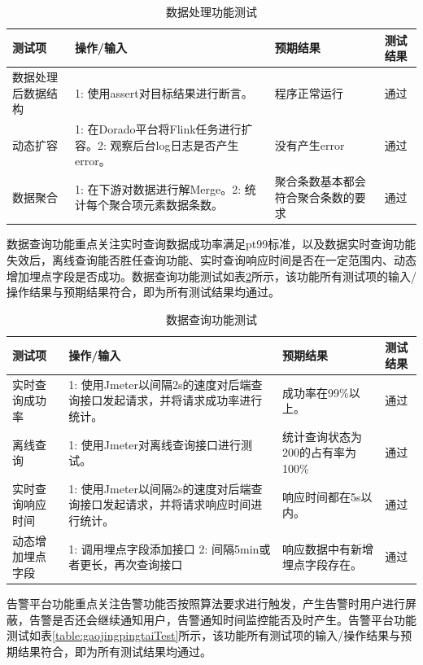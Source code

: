 \begin{longtable}[htbp]
\begin{table}[h]  
\centering  
\caption{数据处理功能测试}
\begin{tabular}{|l|p{4cm}|p{3cm}|l|}  
\hline  
\textbf{测试项} & \textbf{操作/输入} & \textbf{预期结果} & \textbf{测试结果} \\ \hline  
数据处理后数据结构 & 1: 使用assert对目标结果进行断言。 & 程序正常运行 & 通过 \\ \hline  
动态扩容 & 1: 在Dorado平台将Flink任务进行扩容。2: 观察后台log日志是否产生error。 & 没有产生error & 通过 \\ \hline  
数据聚合 & 1: 在下游对数据进行解Merge。2: 统计每个聚合项元素数据条数。 & 聚合条数基本都会符合聚合条数的要求 & 通过 \\ \hline  
\end{tabular}  
\label{table:shujuchuligongnengTest}
\end{table} 
\newpage
数据查询功能重点关注实时查询数据成功率满足pt99标准，以及数据实时查询功能失效后，离线查询能否胜任查询功能、实时查询响应时间是否在一定范围内、动态增加埋点字段是否成功。数据查询功能测试如表\ref{table:shujuhcaxunTest}所示，该功能所有测试项的输入/操作结果与预期结果符合，即为所有测试结果均通过。


\begin{table}[h]  
\centering  
\caption{数据查询功能测试}  
\begin{tabular}{|l|p{4cm}|p{3cm}|l|}  
\hline  
\textbf{测试项} & \textbf{操作/输入} & \textbf{预期结果} & \textbf{测试结果} \\ \hline  
实时查询成功率 & 1: 使用Jmeter以间隔2s的速度对后端查询接口发起请求，并将请求成功率进行统计。 & 成功率在99\%以上。 & 通过 \\ \hline  
离线查询 & 1: 使用Jmeter对离线查询接口进行测试。 & 统计查询状态为200的占有率为100\% & 通过 \\ \hline  
实时查询响应时间 & 1: 使用Jmeter以间隔2s的速度对后端查询接口发起请求，并将请求响应时间进行统计。 & 响应时间都在5s以内。 & 通过 \\ \hline  
动态增加埋点字段 & 1: 调用埋点字段添加接口 2: 间隔5min或者更长，再次查询接口 & 响应数据中有新增埋点字段存在。 & 通过 \\ \hline  
\end{tabular}  
\label{table:shujuhcaxunTest}
\end{table}  

告警平台功能重点关注告警功能否按照算法要求进行触发，产生告警时用户进行屏蔽，告警是否还会继续通知用户，告警通知时间监控能否及时产生。告警平台功能测试如表\ref{table:gaojingpingtaiTest}所示，该功能所有测试项的输入/操作结果与预期结果符合，即为所有测试结果均通过。


\end{longtable}
